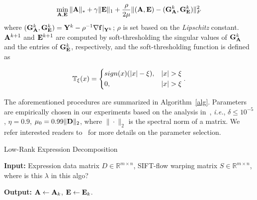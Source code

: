 \documentclass[journal]{IEEEtran}
\begin{document}
\begin{equation} \label{eq:apg_fast}
\min_{\A,\E} \|\A\|_* + \gamma \|\E\|_1 + \frac{\rho}{2\mu}\|(\A,\E)-(\G^k_\A,\G^k_\E)\|^2_F
\end{equation}
where $({\bf G}^k_{\bf A},{\bf G}^k_{\bf E})={\bf Y}^k-\rho^{-1}\nabla {\bf f}|_{{\bf Y}^k}$; $\rho$ is set based on the \textit{Lipschitz} constant. ${\bf A}^{k+1}$ and ${\bf E}^{k+1}$ are computed by soft-thresholding the singular values of ${\bf G}^k_{\bf A}$ and the entries of ${\bf G}^k_{\bf E}$, respectively, and the soft-thresholding function is defined as

\begin{equation}
\mathbb{T}_\xi(x)=
	\begin{dcases}
    sign(x)(|x|-\xi),  	& |x|>\xi \\
    0,  								& |x|>\xi
	\end{dcases}.
\end{equation}

The aforementioned procedures are summarized in Algorithm~\ref{alg}. Parameters are empirically chosen in our experiments based on the analysis in~\cite{Lin09}, \textit{i.e.}, $\delta\leq10^{-5}$, $\eta=0.9$, $\mu_0=0.99\|{\bf D}\|_2$, where $\|\cdot\|_2$ is the spectral norm of a matrix. We refer interested readers to~\cite{Lin09} for more details on the parameter selection. 

\begin{algorithm}[htb]
    \caption{Low-Rank Expression Decomposition}
    \textbf{Input:} Expression data matrix $D\in \mathbb{R}^{m\times n}$, SIFT-flow warping matrix $S\in \mathbb{R}^{m\times n}$, \textcolor[rgb]{1,0,0}{ where is this $\lambda$ in this algo?} \\
    \begin{algorithmic}[1]
			\State{$\D^*=\D+\S$}
				
				
				
			\EndWhile
    \end{algorithmic}
    \textbf{Output:} ${\bf A}\leftarrow {\bf A}_k$, ${\bf E}\leftarrow {\bf E}_k$. \\
    \label{alg}
\end{algorithm}
\end{document}
